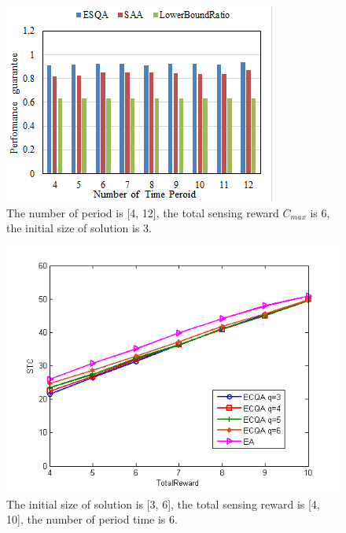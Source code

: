 \documentclass[journal]{IEEEtran}
\begin{document}
\begin{figure}
	\centering
	\includegraphics[width=1\linewidth]{Fig4(d).png}
	\caption{The number of period is [4, 12], the total sensing reward $C_{max}$ is 6, the initial size of solution is 3.}
	\label{fig:figure5}
\end{figure}

\begin{figure}
	\centering
	\includegraphics[width=1\linewidth]{Fig4(e).png}
	\caption{The initial size of solution is [3, 6], the total sensing reward is [4, 10], the number of period time is 6.}
	\label{fig:figure6}
\end{figure}
\end{document}
